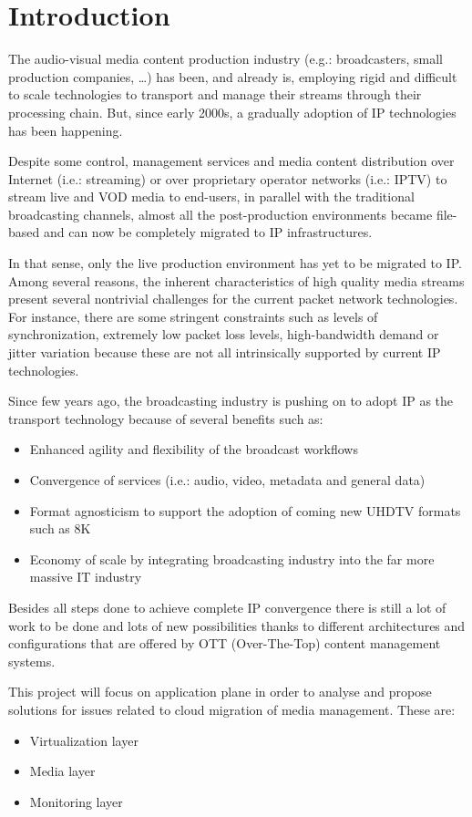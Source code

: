 \cleardoublepage
{}
\chapter*{Introduction}

The audio-visual media content production industry (e.g.: broadcasters, small production companies, \ldots) has been, and already is, employing rigid and difficult to scale technologies to transport and manage their streams through their processing chain. But, since early 2000s, a gradually adoption of IP technologies has been happening.

Despite some control, management services and media content distribution over Internet (i.e.: streaming) or over proprietary operator networks (i.e.: IPTV) to stream live and VOD media to end-users, in parallel with the traditional broadcasting channels, almost all the post-production environments became file-based and can now be completely migrated to IP infrastructures. 

In that sense, only the live production environment has yet to be migrated to IP. Among several reasons, the inherent characteristics of high quality media streams present several nontrivial challenges for the current packet network technologies. For instance, there are some stringent constraints such as levels of synchronization, extremely low packet loss levels, high-bandwidth demand or jitter variation because these are not all intrinsically supported by current IP technologies.

Since few years ago, the broadcasting industry is pushing on to adopt IP as the transport technology because of several benefits such as:

\begin{itemize}
  \item Enhanced agility and flexibility of the broadcast workflows
  \item Convergence of services (i.e.: audio, video, metadata and general data)
  \item Format agnosticism to support the adoption of coming new UHDTV formats such as 8K 
  \item Economy of scale by integrating broadcasting industry into the far more massive IT industry
\end{itemize}

Besides all steps done to achieve complete IP convergence there is still a lot of work to be done and lots of new possibilities thanks to different architectures and configurations that are offered by OTT (Over-The-Top) content management systems. 

This project will focus on application plane in order to analyse and propose solutions for issues related to cloud migration of media management. These are:

 \begin{itemize}
  \item Virtualization layer \hfill \\
  \item Media layer \hfill \\
  \item Monitoring layer \hfill \\
\end{itemize}






